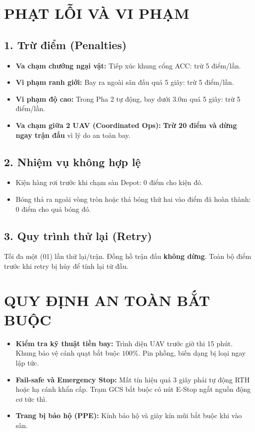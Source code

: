 \documentclass[12pt,a4paper]{article}
\begin{document}
\section{PHẠT LỖI VÀ VI PHẠM}

\subsection*{1. Trừ điểm (Penalties)}
\begin{itemize}
\item \textbf{Va chạm chướng ngại vật:} Tiếp xúc khung cổng ACC: trừ 5 điểm/lần.
\item \textbf{Vi phạm ranh giới:} Bay ra ngoài sân đấu quá 5 giây: trừ 5 điểm/lần.
\item \textbf{Vi phạm độ cao:} Trong Pha 2 tự động, bay dưới $3.0$m quá 5 giây: trừ 5 điểm/lần.
\item \textbf{Va chạm giữa 2 UAV (Coordinated Ops):} \textbf{Trừ 20 điểm và dừng ngay trận đấu} vì lý do an toàn bay.
\end{itemize}

\subsection*{2. Nhiệm vụ không hợp lệ}
\begin{itemize}
\item Kiện hàng rơi trước khi chạm sàn Depot: 0 điểm cho kiện đó.
\item Bóng thả ra ngoài vòng tròn hoặc thả bóng thứ hai vào điểm đã hoàn thành: 0 điểm cho quả bóng đó.
\end{itemize}

\subsection*{3. Quy trình thử lại (Retry)}
Tối đa một (01) lần thử lại/trận. Đồng hồ trận đấu \textbf{không dừng}. Toàn bộ điểm trước khi retry bị hủy để tính lại từ đầu.

\section{QUY ĐỊNH AN TOÀN BẮT BUỘC}

\begin{itemize}
\item \textbf{Kiểm tra kỹ thuật tiền bay:} Trình diện UAV trước giờ thi 15 phút. Khung bảo vệ cánh quạt bắt buộc $100\%$. Pin phồng, biến dạng bị loại ngay lập tức.
\item \textbf{Fail-safe và Emergency Stop:} Mất tín hiệu quá 3 giây phải tự động RTH hoặc hạ cánh khẩn cấp. Trạm GCS bắt buộc có nút E-Stop ngắt nguồn động cơ tức thì.
\item \textbf{Trang bị bảo hộ (PPE):} Kính bảo hộ và giày kín mũi bắt buộc khi vào sân.
\end{itemize}
\end{document}
